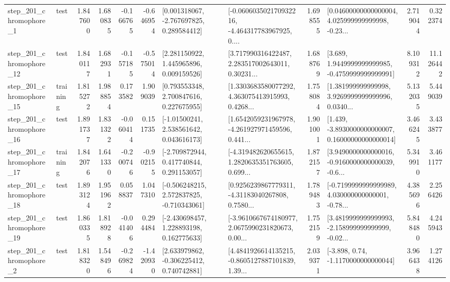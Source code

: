\begin{tabular}{llrrrrllrlrr}
   step\_201\_chromophore\_1 &      test &      1.847600 &    1.680835 &     -0.166765 & -0.646954 &    [0.001318067, -2.767697825, 0.289584412] &  [-0.060603502170932216, -4.464317783967925, 0.... &       1.698555 &  [0.04600000000000004, 4.025999999999998, -0.23... &            2.719044 &          0.322374 \\
  step\_201\_chromophore\_12 &      test &      1.840117 &    1.682931 &     -0.157185 & -0.575014 &     [2.281150922, 1.445965896, 0.009159526] &  [3.717990316422487, 2.283517002643011, 0.30231... &       1.688769 &   [3.689, 1.9449999999999985, -0.4759999999999991] &            8.109312 &         11.126442 \\
  step\_201\_chromophore\_15 &  training &      1.815272 &    1.988854 &      0.173582 &  1.909039 &     [0.793553348, 2.700847616, 0.227675955] &  [1.3303683580077292, 4.363075413915993, 0.4268... &       1.758084 &  [1.381999999999998, 3.9269999999999996, 0.0340... &            5.132035 &          5.449039 \\
  step\_201\_chromophore\_16 &      test &      1.891737 &    1.831322 &     -0.060414 &  0.151735 &     [-1.01500241, 2.538561642, 0.043616173] &  [1.6542059231967978, -4.261927971459596, 0.441... &       1.901001 &  [1.439, -3.8930000000000007, 0.16000000000000014] &            3.466245 &          3.433877 \\
  step\_201\_chromophore\_17 &  training &      1.842076 &    1.641330 &     -0.200746 & -0.902155 &    [-2.709872944, 0.417740844, 0.291153057] &  [-4.319482620655615, 1.2820635351763605, 0.699... &       1.872157 &  [3.9490000000000016, -0.9160000000000039, -0.6... &            5.349910 &          3.461177 \\
  step\_201\_chromophore\_18 &      test &      1.893124 &    1.951962 &      0.058837 &  1.047310 &   [-0.506248215, 2.572837825, -0.710343061] &  [0.9256239867779311, -4.31183040267808, 0.7580... &       1.789483 &  [-0.7199999999999989, 4.030000000000001, -0.78... &            4.385696 &          2.256426 \\
  step\_201\_chromophore\_19 &      test &      1.860335 &    1.818928 &     -0.041406 &  0.294484 &    [-2.430698457, 1.228893198, 0.162775633] &  [-3.9610667674180977, 2.0675990231820673, 0.00... &       1.752159 &  [3.4819999999999993, -2.158999999999999, -0.02... &            5.848480 &          4.245943 \\
   step\_201\_chromophore\_2 &      test &      1.818320 &    1.548496 &     -0.269824 & -1.420930 &    [2.633979862, -0.306225412, 0.740742881] &  [4.4841926614135215, -0.8605127887101839, 1.39... &       2.039371 &                [-3.898, 0.74, -1.1170000000000044] &            3.966438 &          1.274126 \\

\end{tabular}
